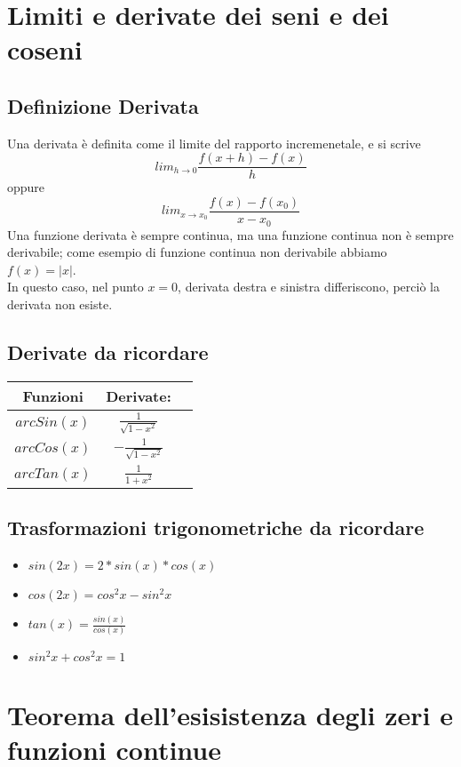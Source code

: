 \documentclass[11pt]{article}
\begin{document}
\section{Limiti e derivate dei seni e dei coseni}
\subsection{Definizione Derivata}
Una derivata è definita come il limite del rapporto incremenetale, e si scrive $$lim_{h \rightarrow 0}\frac{f(x+h)-f(x)}{h}$$ oppure 
$$lim_{x \rightarrow x_{0}}\frac{f(x)-f(x_{0})}{x-x_{0}}$$
Una funzione derivata è sempre continua, ma una funzione continua non è sempre derivabile; come esempio di funzione continua non derivabile abbiamo $f(x) = |x|$.\\
In questo caso, nel punto $x=0$, derivata destra e sinistra differiscono, perciò la derivata non esiste.
\subsection{Derivate da ricordare}
\begin{center}
 \begin{tabular}{|c|c|c|}
 \hline
 Funzioni & Derivate:\\
 \hline \hline
 $arcSin(x)$ & $\frac{1}{\sqrt{1-x^{2}}}$\\
 \hline
 $arcCos(x)$ & $-\frac{1}{\sqrt{1-x^{2}}}$\\
 \hline
 $arcTan(x)$ & $\frac{1}{1+x^{2}}$\\
 \hline
 \end{tabular}
\end{center}
\subsection{Trasformazioni trigonometriche da ricordare}
\begin{itemize}
    \item $sin(2x) = 2*sin(x)*cos(x)$
    \item $cos(2x) = cos^{2}x - sin^{2}x$
    \item $tan(x) = \frac{sin(x)}{cos(x)}$
    \item $sin^{2}x + cos^{2}x = 1$
\end{itemize}
\section{Teorema dell'esisistenza degli zeri e funzioni continue}
\end{document}
